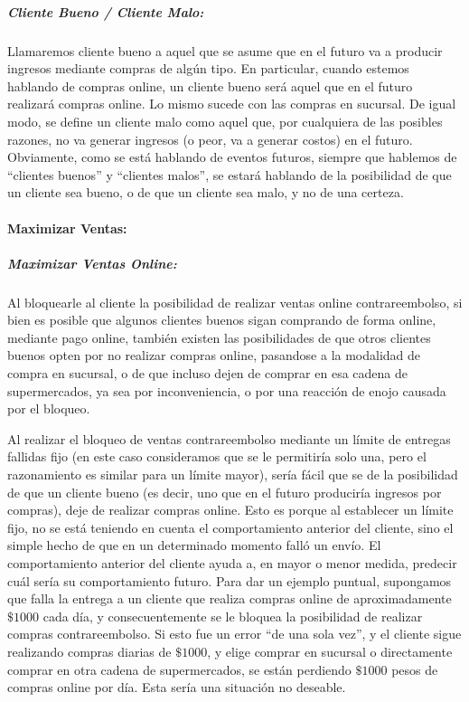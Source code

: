 \subparagraph{Cliente Bueno / Cliente Malo:}

Llamaremos cliente bueno a aquel que se asume que en el futuro va a producir
ingresos mediante compras de algún tipo. En particular, cuando estemos
hablando de compras online, un cliente bueno será aquel que en el futuro
realizará compras online. Lo mismo sucede con las compras en sucursal. De
igual modo, se define un cliente malo como aquel que, por cualquiera de las
posibles razones, no va generar ingresos (o peor, va a generar costos) en el
futuro. Obviamente, como se está hablando de eventos futuros, siempre que
hablemos de ``clientes buenos'' y ``clientes malos'', se estará hablando de la
posibilidad de que un cliente sea bueno, o de que un cliente sea malo, y no de
una certeza.

\paragraph{Maximizar Ventas:}

\subparagraph{Maximizar Ventas Online:}

Al bloquearle al cliente la posibilidad de realizar ventas online
contrareembolso, si bien es posible que algunos clientes buenos sigan
comprando de forma online, mediante pago online, también existen las
posibilidades de que otros clientes buenos opten por no realizar compras
online, pasandose a la modalidad de compra en sucursal, o de que incluso dejen
de comprar en esa cadena de supermercados, ya sea por inconveniencia, o por
una reacción de enojo causada por el bloqueo.

Al realizar el bloqueo de ventas contrareembolso mediante un límite de
entregas fallidas fijo (en este caso consideramos que se le permitiría solo
una, pero el razonamiento es similar para un límite mayor), sería fácil que se
de la posibilidad de que un cliente bueno (es decir, uno que en el futuro
produciría ingresos por compras), deje de realizar compras online. Esto es
porque al establecer un límite fijo, no se está teniendo en cuenta el
comportamiento anterior del cliente, sino el simple hecho de que en un
determinado momento falló un envío. El comportamiento anterior del cliente
ayuda a, en mayor o menor medida, predecir cuál sería su comportamiento
futuro. Para dar un ejemplo puntual, supongamos que falla la entrega a un
cliente que realiza compras online de aproximadamente $\$1000$ cada día, y
consecuentemente se le bloquea la posibilidad de realizar compras
contrareembolso. Si esto fue un error ``de una sola vez'', y el cliente sigue
realizando compras diarias de $\$1000$, y elige comprar en sucursal o
directamente comprar en otra cadena de supermercados, se están perdiendo
$\$1000$ pesos de compras online por día. Esta sería una situación no
deseable.

